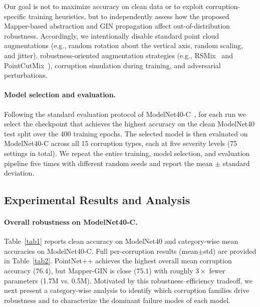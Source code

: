 \documentclass{article}
\begin{document}
Our goal is not to maximize accuracy on clean data or to exploit corruption-specific training heuristics, but to independently assess how the proposed Mapper-based abstraction and GIN propagation affect out-of-distribution robustness. Accordingly, we intentionally disable standard point cloud augmentations (e.g., random rotation about the vertical axis, random scaling, and jitter), robustness-oriented augmentation strategies (e.g., RSMix~\cite{9577799} and PointCutMix~\cite{ZHANG202258}), corruption simulation during training, and adversarial perturbations.

\paragraph{Model selection and evaluation.}
Following the standard evaluation protocol of ModelNet40-C~\cite{modelnetbench2022}, for each run we select the checkpoint that achieves the highest accuracy on the clean ModelNet40 test split over the 400 training epochs.
The selected model is then evaluated on ModelNet40-C across all 15 corruption types, each at five severity levels (75 settings in total).
We repeat the entire training, model selection, and evaluation pipeline five times with different random seeds
and report the mean $\pm$ standard deviation.

\subsection{Experimental Results and Analysis}
\paragraph{Overall robustness on ModelNet40-C.}
Table~\ref{tab1} reports clean accuracy on ModelNet40 and category-wise mean accuracies on ModelNet40-C.
Full per-corruption results (mean$\pm$std) are provided in Table~\ref{tab2}.
PointNet++ achieves the highest overall mean corruption accuracy ($76.4$), but Mapper-GIN is close ($75.1$) with roughly $3\times$ fewer parameters (1.7M vs.\! 0.5M).
Motivated by this robustness–efficiency tradeoff, we next present a category-wise analysis to identify which corruption families drive robustness and to characterize the dominant failure modes of each model.
\end{document}
